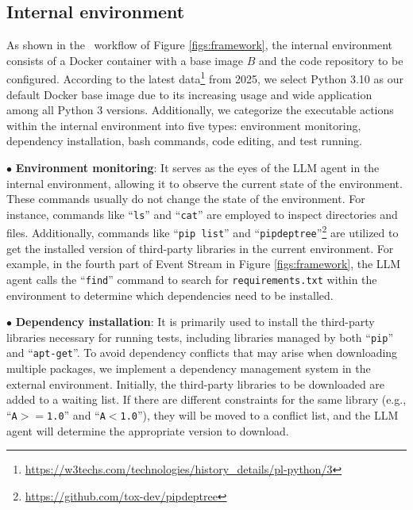 \subsection{Internal environment}

As shown in the \tool~workflow of Figure \ref{figs:framework}, the internal environment consists of a Docker container with a base image $B$ and the code repository to be configured. According to the latest data\footnote{\url{https://w3techs.com/technologies/history_details/pl-python/3}}
 from 2025, we select Python 3.10 as our default Docker base image due to its increasing usage and wide application among all Python 3 versions. Additionally, we categorize the executable actions within the internal environment into five types: environment monitoring, dependency installation, bash commands, code editing, and test running.

$\bullet$ \textbf{Environment monitoring}:
It serves as the eyes of the LLM agent in the internal environment, allowing it to observe the current state of the environment. These commands usually do not change the state of the environment. For instance, commands like ``\texttt{ls}'' and ``\texttt{cat}'' are employed to inspect directories and files. Additionally, commands like ``\texttt{pip list}'' and ``\texttt{pipdeptree}''\footnote{\url{https://github.com/tox-dev/pipdeptree}} are utilized to get the installed version of third-party libraries in the current environment.
For example, in the fourth part of Event Stream in Figure \ref{figs:framework}, the LLM agent calls the ``\texttt{find}'' command to search for \texttt{requirements.txt} within the environment to determine which dependencies need to be installed.

$\bullet$ \textbf{Dependency installation}:
It is primarily used to install the third-party libraries necessary for running tests, including libraries managed by both ``\texttt{pip}'' and ``\texttt{apt-get}''. To avoid dependency conflicts that may arise when downloading multiple packages, we implement a dependency management system in the external environment. Initially, the third-party libraries to be downloaded are added to a waiting list. If there are different constraints for the same library (e.g., ``\texttt{A$>=$1.0}'' and ``\texttt{A$<$1.0}''), they will be moved to a conflict list, and the LLM agent will determine the appropriate version to download.

